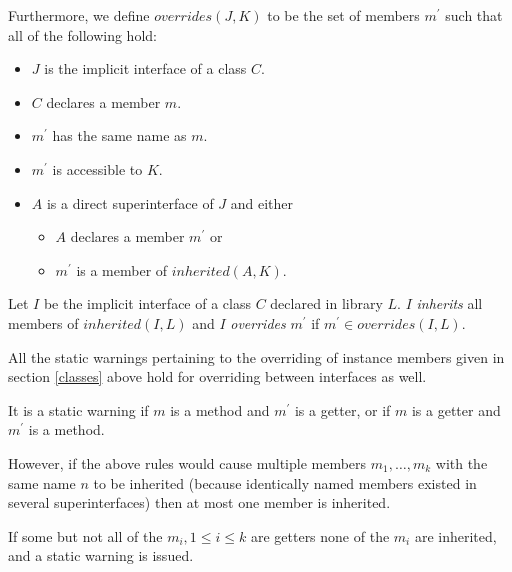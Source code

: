 \documentclass{article}
\begin{document}
\LMHash{}
Furthermore, we define $overrides(J, K)$  to be the set of members $m^\prime$ such that  all of the following hold:
\begin{itemize}
\item $J$ is the implicit interface of a class $C$.
\item  $C$ declares a member $m$.
\item $m^\prime$ has the same name as $m$.
\item $m^\prime$ is accessible to $K$.  
\item $A$ is a direct superinterface of $J$ and either
  \begin{itemize}
  \item $A$ declares a member $m^\prime$ or 
  \item $m^\prime$ is a member of $inherited(A, K)$.
  \end{itemize}
\end{itemize}


\LMHash{}
Let $I$ be the implicit interface of a class $C$ declared in library $L$.  $I$ {\em inherits} all members of $inherited(I, L)$ and $I$ {\em overrides} $m^\prime$ if  $m^\prime \in overrides(I, L)$. 

\LMHash{}
All the static warnings pertaining to the overriding of instance members given in section \ref{classes} above hold for overriding between interfaces as well.

\LMHash{}
It is a static warning if $m$ is a method and $m^\prime$ is a getter, or if $m$ is a getter and $m^\prime$ is a method.






\LMHash{}
However, if the above rules would cause multiple members $m_1, \ldots,  m_k$ with the same name $n$ to be inherited (because identically named members existed in several superinterfaces) then at most one member is inherited. 

\LMHash{}
If some but not all of the $m_i, 1 \le i \le k$ are getters none of the $m_i$ are inherited, and a static warning is issued.
\end{document}
